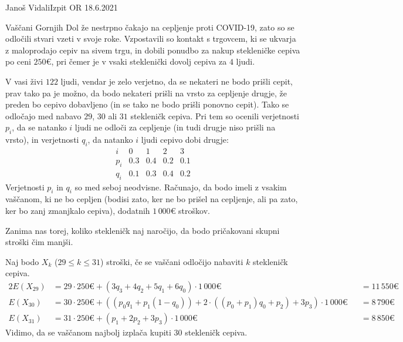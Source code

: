 \begin{naloga}{Janoš Vidali}{Izpit OR 18.6.2021}
\begin{vprasanje}
Vaščani Gornjih Dol že nestrpno čakajo na cepljenje proti COVID-19,
zato so se odločili stvari vzeti v svoje roke.
Vzpostavili so kontakt s trgovcem,
ki se ukvarja z maloprodajo cepiv na sivem trgu,
in dobili ponudbo za nakup stekleničke cepiva po ceni $250 €$,
pri čemer je v vsaki steklenički dovolj cepiva za $4$ ljudi.

V vasi živi $122$ ljudi,
vendar je zelo verjetno, da se nekateri ne bodo prišli cepit,
prav tako pa je možno, da bodo nekateri prišli na vrsto za cepljenje drugje,
že preden bo cepivo dobavljeno (in se tako ne bodo prišli ponovno cepit).
Tako se odločajo med nabavo $29$, $30$ ali $31$ stekleničk cepiva.
Pri tem so ocenili verjetnosti $p_i$,
da se natanko $i$ ljudi ne odloči za cepljenje
(in tudi drugje niso prišli na vrsto),
in verjetnosti $q_i$, da natanko $i$ ljudi cepivo dobi drugje:
$$
\begin{array}{c|cccc}
i & 0 & 1 & 2 & 3 \\ \hline
p_i & 0.3 & 0.4 & 0.2 & 0.1 \\
q_i & 0.1 & 0.3 & 0.4 & 0.2
\end{array}
$$
Verjetnosti $p_i$ in $q_i$ so med seboj neodvisne.
Računajo, da bodo imeli z vsakim vaščanom, ki ne bo cepljen
(bodisi zato, ker ne bo prišel na cepljenje,
ali pa zato, ker bo zanj zmanjkalo cepiva),
dodatnih $1\,000 €$ stroškov.

Zanima nas torej, koliko stekleničk naj naročijo,
da bodo pričakovani skupni stroški čim manjši.
\end{vprasanje}

\begin{odgovor}
Naj bodo $X_k$ ($29 \le k \le 31$) stroški,
če se vaščani odločijo nabaviti $k$ stekleničk cepiva.
\begin{alignat*}{2}
E(X_{29}) &= 29 \cdot 250 € + (3 q_3 + 4 q_2 + 5 q_1 + 6 q_0) \cdot 1\,000 € &&= 11\,550 € \\
E(X_{30}) &= 30 \cdot 250 € + ((p_0 q_1 + p_1 (1 - q_0)) + 2 \cdot ((p_0 + p_1) q_0 + p_2) + 3 p_3) \cdot 1\,000 € &&= 8\,790 € \\
E(X_{31}) &= 31 \cdot 250 € + (p_1 + 2 p_2 + 3 p_3) \cdot 1\,000 € &&= 8\,850 €
\end{alignat*}
Vidimo, da se vaščanom najbolj izplača kupiti $30$ stekleničk cepiva.
\end{odgovor}
\end{naloga}
